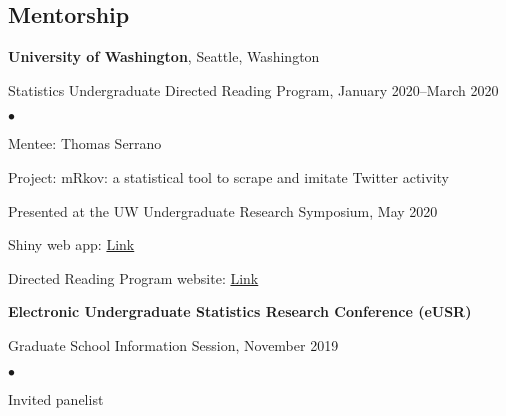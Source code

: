 \documentclass[margin,centered]{res}
\newenvironment{list1}{
  \begin{list}{\ding{113}}{%
      \setlength{\itemsep}{0in}
      \setlength{\parsep}{0in} \setlength{\parskip}{0in}
      \setlength{\topsep}{0in} \setlength{\partopsep}{0in}
      \setlength{\leftmargin}{0.17in}}}{\end{list}}
\newenvironment{list2}{
  \begin{list}{$\bullet$}{%
      \setlength{\itemsep}{0in}
      \setlength{\parsep}{0in} \setlength{\parskip}{0in}
      \setlength{\topsep}{0in} \setlength{\partopsep}{0in}
      \setlength{\leftmargin}{0.2in}}}{\end{list}}
\begin{document}
\begin{resume}
\newpage

\section{\sc Mentorship}

{\bf University of Washington}, Seattle, Washington
\begin{list1}
\item[] Statistics Undergraduate Directed Reading Program, January 2020--March 2020
\begin{list2}
\vspace*{.05in}
\item Mentee: Thomas Serrano
\item Project: m{R}kov: a statistical tool to scrape and imitate {T}witter activity
\item Presented at the UW Undergraduate Research Symposium, May 2020
\item Shiny web app: \href{https://serrat839.shinyapps.io/mRkov_shiny/}{Link}
\item Directed Reading Program website: \href{https://spa-drp.github.io}{Link}
\end{list2}
\end{list1}

{\bf Electronic Undergraduate Statistics Research Conference (eUSR)}
\begin{list1}
\item[] Graduate School Information Session, November 2019
\begin{list2}
\vspace*{.05in}
\item Invited panelist
\end{list2}
\end{list1}








\end{resume}
\end{document}
